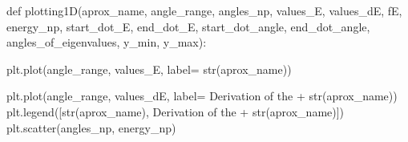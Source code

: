 \documentclass[
  letterpaper,
  DIV=11,
  numbers=noendperiod]{scrartcl}
\newenvironment{Shaded}{\begin{snugshade}}{\end{snugshade}}
\newcommand{\BuiltInTok}[1]{\textcolor[rgb]{0.00,0.23,0.31}{#1}}
\newcommand{\KeywordTok}[1]{\textcolor[rgb]{0.00,0.23,0.31}{#1}}
\newcommand{\NormalTok}[1]{\textcolor[rgb]{0.00,0.23,0.31}{#1}}
\newcommand{\OperatorTok}[1]{\textcolor[rgb]{0.37,0.37,0.37}{#1}}
\newcommand{\StringTok}[1]{\textcolor[rgb]{0.13,0.47,0.30}{#1}}
\begin{document}
\begin{Shaded}
\begin{Highlighting}[]
    \KeywordTok{def}\NormalTok{ plotting1D(aprox\_name, angle\_range, angles\_np, values\_E, values\_dE, fE, energy\_np, start\_dot\_E, end\_dot\_E, start\_dot\_angle, end\_dot\_angle, angles\_of\_eigenvalues, y\_min, y\_max):}
        
\NormalTok{        plt.plot(angle\_range, values\_E, label}\OperatorTok{=} \BuiltInTok{str}\NormalTok{(aprox\_name))}
        
\NormalTok{        plt.plot(angle\_range, values\_dE, label}\OperatorTok{=} \StringTok{\textquotesingle{}Derivation of the \textquotesingle{}} \OperatorTok{+} \BuiltInTok{str}\NormalTok{(aprox\_name))}
\NormalTok{        plt.legend([}\BuiltInTok{str}\NormalTok{(aprox\_name), }\StringTok{\textquotesingle{}Derivation of the \textquotesingle{}} \OperatorTok{+} \BuiltInTok{str}\NormalTok{(aprox\_name)])}
\NormalTok{        plt.scatter(angles\_np, energy\_np)}
        

\end{Highlighting}
\end{Shaded}
\end{document}
